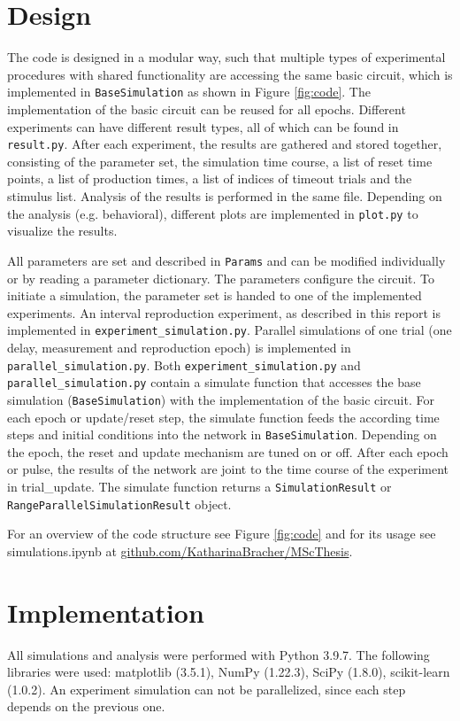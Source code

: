 \documentclass[10pt]{article}
\begin{document}
\section{Design}
The code is designed in a modular way, such that multiple types of experimental procedures with shared functionality are accessing the same basic circuit, which is implemented in \texttt{BaseSimulation} as shown in Figure \ref{fig:code}.
The implementation of the basic circuit can be reused for all epochs.
Different experiments can have different result types, all of which can be found in \texttt{result.py}. After each experiment, the results are gathered and stored together, consisting of the parameter set, the simulation time course, a list of reset time points, a list of production times, a list of indices of timeout trials and the stimulus list.
Analysis of the results is performed in the same file. Depending on the analysis (e.g. behavioral), different plots are implemented in \texttt{plot.py} to visualize the results. 

All parameters are set and described in \texttt{Params} and can be modified individually or by reading a parameter dictionary. The parameters configure the circuit. 
To initiate a simulation, the parameter set is handed to one of the implemented experiments. 
An interval reproduction experiment, as described in this report is implemented in \texttt{experiment\_simulation.py}. 
Parallel simulations of one trial (one delay, measurement and reproduction epoch) is implemented in \texttt{parallel\_simulation.py}.
Both \texttt{experiment\_simulation.py} and \texttt{parallel\_simulation.py} contain a simulate function that accesses the base simulation (\texttt{BaseSimulation}) with the implementation of the basic circuit.
For each epoch or update/reset step, the simulate function feeds the according time steps and initial conditions into the network in \texttt{BaseSimulation}. Depending on the epoch, the reset and update mechanism are tuned on or off. 
After each epoch or pulse, the results of the network are joint to the time course of the experiment in trial\_update. The simulate function returns a \texttt{SimulationResult} or \texttt{RangeParallelSimulationResult} object.

For an overview of the code structure see Figure \ref{fig:code} and for its usage see simulations.ipynb at \href{https://github.com/KatharinaBracher/MScThesis}{github.com/KatharinaBracher/MScThesis}. 

\section{Implementation}
All simulations and analysis were performed with Python 3.9.7. 
The following libraries were used: matplotlib (3.5.1), NumPy (1.22.3), SciPy (1.8.0), scikit-learn (1.0.2). 
An experiment simulation can not be parallelized, since each step depends on the previous one.
\end{document}
